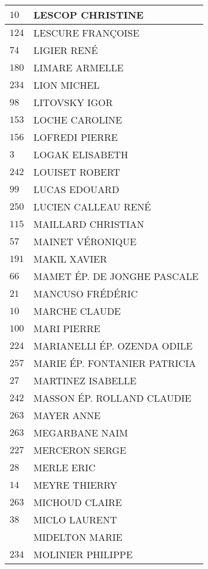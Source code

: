 \begin{xltabular}{\linewidth}{|l|X|}
    \hline
    $10$ & LESCOP CHRISTINE \\
    \hline
    $124$ & LESCURE FRANÇOISE \\
    \hline
    $74$ & LIGIER RENÉ \\
    \hline
    $180$ & LIMARE ARMELLE \\
    \hline
    $234$ & LION MICHEL \\
    \hline
    $98$ & LITOVSKY IGOR \\
    \hline
    $153$ & LOCHE CAROLINE \\
    \hline
    $156$ & LOFREDI PIERRE \\
    \hline
    $3$ & LOGAK ELISABETH \\
    \hline
    $242$ & LOUISET ROBERT \\
    \hline
    $99$ & LUCAS EDOUARD \\
    \hline
    $250$ & LUCIEN CALLEAU RENÉ \\
    \hline
    $115$ & MAILLARD CHRISTIAN \\
    \hline
    $57$ & MAINET VÉRONIQUE \\
    \hline
    $191$ & MAKIL XAVIER \\
    \hline
    $66$ & MAMET ÉP. DE JONGHE PASCALE \\
    \hline
    $21$ & MANCUSO FRÉDÉRIC \\
    \hline
    $10$ & MARCHE CLAUDE \\
    \hline
    $100$ & MARI PIERRE \\
    \hline
    $224$ & MARIANELLI ÉP. OZENDA ODILE \\
    \hline
    $257$ & MARIE ÉP. FONTANIER PATRICIA \\
    \hline
    $27$ & MARTINEZ ISABELLE \\
    \hline
    $242$ & MASSON ÉP. ROLLAND CLAUDIE \\
    \hline
    $263$ & MAYER ANNE \\
    \hline
    $263$ & MEGARBANE NAIM \\
    \hline
    $227$ & MERCERON SERGE \\
    \hline
    $28$ & MERLE ERIC \\
    \hline
    $14$ & MEYRE THIERRY \\
    \hline
    $263$ & MICHOUD CLAIRE \\
    \hline
    $38$ & MICLO LAURENT \\
    \hline
    & MIDELTON MARIE \\
    \hline
    $234$ & MOLINIER PHILIPPE \\

\end{xltabular}
